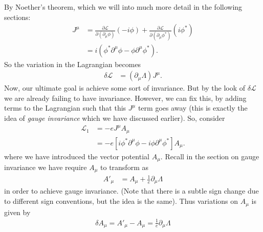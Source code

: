 \documentclass[a4paper,11pt]{article}
\numberwithin{equation}{section}
\theoremstyle{definition}
\newcommand{\p}{\partial}
\newcommand{\lag}{\mathcal{L}}
\begin{document}
By Noether's theorem, which we will into much more detail in the following sections:
\begin{align}
J^\mu &= \frac{\p\lag}{\p(\p_\mu\phi)}(-i\phi) + \frac{\p\lag}{\p(\p_\mu\phi^*)}(i\phi^*)\\
&= i(\phi^*\p^\mu\phi - \phi\p^\mu\phi^*).
\end{align}
So the variation in the Lagrangian becomes
\begin{align}
\delta \lag &= (\p_\mu\Lambda)J^\mu. 
\end{align}
Now, our ultimate goal is achieve some sort of invariance. But by the look of $\delta \lag$ we are already failing to have invariance. However, we can fix this, by adding terms to the Lagrangian such that this $J^\mu$ term goes away (this is exactly the idea of \textit{gauge invariance} which we have discussed earlier). So, consider
\begin{align}
\lag_1 &= -eJ^\mu A_\mu\\
&= -e[i\phi^*\p^\mu\phi - i\phi\p^\mu\phi^*]A_\mu.
\end{align}
where we have introduced the vector potential $A_\mu$. Recall in the section on gauge invariance we have require $A_\mu$ to transform as
\begin{align}
A'_\mu&= A_\mu + \frac{1}{e}\p_\mu\Lambda
\end{align}
in order to achieve gauge invariance. (Note that there is a subtle sign change due to different sign conventions, but the idea is the same). Thus variations on $A_\mu$ is given by
\begin{align}
\delta A_\mu = A'_\mu - A_\mu = \frac{1}{e}\p_\mu\Lambda
\end{align}
\end{document}
